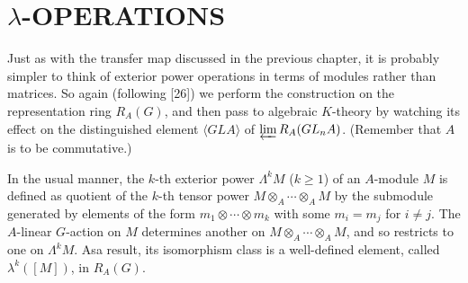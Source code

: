 \documentclass[openany,leqno]{book}  %
\begin{document}
\section*{$\lambda$-OPERATIONS}
Just as with the transfer map discussed in the previous chapter, it is probably simpler to think of exterior power operations in terms of modules rather than matrices. So again (following [26]) we perform the construction on the representation ring $R_A(G)$, and then pass to algebraic $K$-theory by watching its effect on the distinguished element $\langle GLA \rangle$ of $\varprojlim R_A(GL_n A)$. (Remember that $A$ is to be commutative.)

In the usual manner, the $k$-th exterior power $\Lambda^k M$ ($k \geqslant 1$) of an $A$-module $M$ is defined as
quotient of the $k$-th tensor power $M\otimes_A\cdots  \otimes_A M$ by the submodule generated by elements of the form $m_1 \otimes\cdots  \otimes m_k$ with some $m_i=m_j$ for $i \neq j$. The $A$-linear $G$-action on $M$ determines another on $M\otimes_A \cdots \otimes_A M$, and so restricts to one on $\Lambda^k M$. Asa result, its isomorphism class is a well-defined element, called $\lambda^k([M])$, in $R_A(G)$.
\end{document}
